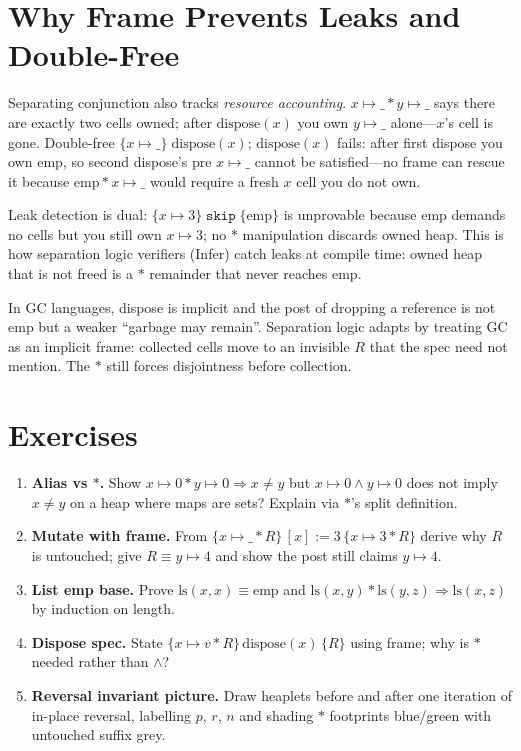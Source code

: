 \section{Why Frame Prevents Leaks and Double-Free}
\label{sec:frame-safety}
Separating conjunction also tracks \emph{resource accounting}. $x\mapsto\_ * y\mapsto\_$ says there are exactly two cells owned; after $\text{dispose}(x)$ you own $y\mapsto\_$ alone—$x$'s cell is gone. Double-free $\{x\mapsto\_\}\;\text{dispose}(x);\,\text{dispose}(x)$ fails: after first dispose you own $\text{emp}$, so second dispose's pre $x\mapsto\_$ cannot be satisfied—no frame can rescue it because $\text{emp} * x\mapsto\_$ would require a fresh $x$ cell you do not own.

Leak detection is dual: $\{x\mapsto3\}\;\texttt{skip}\;\{\text{emp}\}$ is unprovable because $\text{emp}$ demands no cells but you still own $x\mapsto3$; no $*$ manipulation discards owned heap. This is how separation logic verifiers (Infer) catch leaks at compile time: owned heap that is not freed is a $*$ remainder that never reaches $\text{emp}$.

\begin{remark}
In GC languages, dispose is implicit and the post of dropping a reference is not $\text{emp}$ but a weaker ``garbage may remain''. Separation logic adapts by treating GC as an implicit frame: collected cells move to an invisible $R$ that the spec need not mention. The $*$ still forces disjointness before collection.
\end{remark}

\section{Exercises}
\label{sec:ch07-exercises}
\begin{enumerate}[label=E7.\arabic*, leftmargin=*, itemsep=0.6em]
    \item \textbf{Alias vs $*$.} Show $x\mapsto0 * y\mapsto0\Rightarrow x\neq y$ but $x\mapsto0\land y\mapsto0$ does not imply $x\neq y$ on a heap where maps are sets? Explain via $*$'s split definition.
    \item \textbf{Mutate with frame.} From $\{x\mapsto\_*R\}\, [x]:=3 \,\{x\mapsto3*R\}$ derive why $R$ is untouched; give $R\equiv y\mapsto4$ and show the post still claims $y\mapsto4$.
    \item \textbf{List emp base.} Prove $\text{ls}(x,x)\equiv\text{emp}$ and $\text{ls}(x,y) * \text{ls}(y,z)\Rightarrow \text{ls}(x,z)$ by induction on length.
    \item \textbf{Dispose spec.} State $\{x\mapsto v * R\}\,\text{dispose}(x)\,\{R\}$ using frame; why is $*$ needed rather than $\land$?
    \item \textbf{Reversal invariant picture.} Draw heaplets before and after one iteration of in-place reversal, labelling $p$, $r$, $n$ and shading $*$ footprints blue/green with untouched suffix grey.
\end{enumerate}


